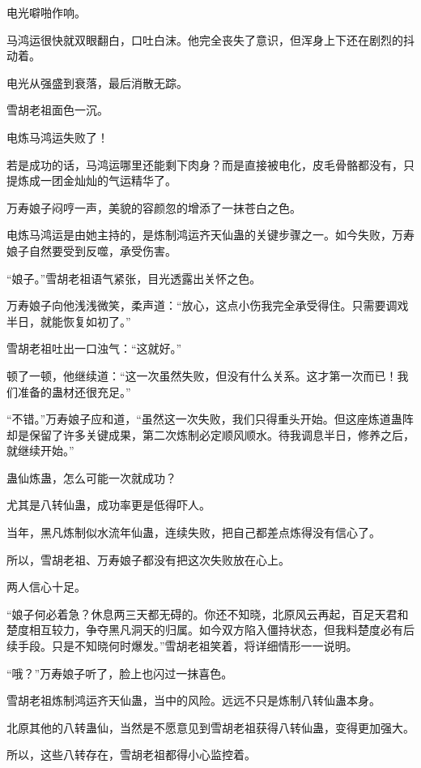 
\begin{this_body}

电光噼啪作响。

马鸿运很快就双眼翻白，口吐白沫。他完全丧失了意识，但浑身上下还在剧烈的抖动着。

电光从强盛到衰落，最后消散无踪。

雪胡老祖面色一沉。

电炼马鸿运失败了！

若是成功的话，马鸿运哪里还能剩下肉身？而是直接被电化，皮毛骨骼都没有，只提炼成一团金灿灿的气运精华了。

万寿娘子闷哼一声，美貌的容颜忽的增添了一抹苍白之色。

电炼马鸿运是由她主持的，是炼制鸿运齐天仙蛊的关键步骤之一。如今失败，万寿娘子自然要受到反噬，承受伤害。

“娘子。”雪胡老祖语气紧张，目光透露出关怀之色。

万寿娘子向他浅浅微笑，柔声道：“放心，这点小伤我完全承受得住。只需要调戏半日，就能恢复如初了。”

雪胡老祖吐出一口浊气：“这就好。”

顿了一顿，他继续道：“这一次虽然失败，但没有什么关系。这才第一次而已！我们准备的蛊材还很充足。”

“不错。”万寿娘子应和道，“虽然这一次失败，我们只得重头开始。但这座炼道蛊阵却是保留了许多关键成果，第二次炼制必定顺风顺水。待我调息半日，修养之后，就继续开始。”

蛊仙炼蛊，怎么可能一次就成功？

尤其是八转仙蛊，成功率更是低得吓人。

当年，黑凡炼制似水流年仙蛊，连续失败，把自己都差点炼得没有信心了。

所以，雪胡老祖、万寿娘子都没有把这次失败放在心上。

两人信心十足。

“娘子何必着急？休息两三天都无碍的。你还不知晓，北原风云再起，百足天君和楚度相互较力，争夺黑凡洞天的归属。如今双方陷入僵持状态，但我料楚度必有后续手段。只是不知晓何时爆发。”雪胡老祖笑着，将详细情形一一说明。

“哦？”万寿娘子听了，脸上也闪过一抹喜色。

雪胡老祖炼制鸿运齐天仙蛊，当中的风险。远远不只是炼制八转仙蛊本身。

北原其他的八转蛊仙，当然是不愿意见到雪胡老祖获得八转仙蛊，变得更加强大。

所以，这些八转存在，雪胡老祖都得小心监控着。


\end{this_body}
